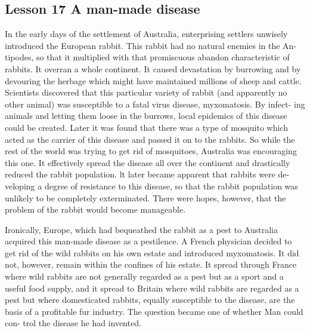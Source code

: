\documentclass[kindlepaper]{BHCexam4kindle}
\begin{document}
\subsection{Lesson 17
A man-made disease}
\par
In the early days of the settlement of Australia, enterprising settlers unwisely
introduced the European rabbit. This rabbit had no natural enemies in the An-
tipodes, so that it multiplied with that promiscuous abandon characteristic of
rabbits. It overran a whole continent. It caused devastation by burrowing and
by devouring the herbage which might have maintained millions of sheep and
cattle. Scientists discovered that this particular variety of rabbit (and apparently
no other animal) was susceptible to a fatal virus disease, myxomatosis. By infect-
ing animals and letting them loose in the burrows, local epidemics of this disease
could be created. Later it was found that there was a type of mosquito which
acted as the carrier of this disease and passed it on to the rabbits. So while the
rest of the world was trying to get rid of mosquitoes, Australia was encouraging
this one. It effectively spread the disease all over the continent and drastically
reduced the rabbit population. lt later became apparent that rabbits were de-
veloping a degree of resistance to this disease, so that the rabbit population was
unlikely to be completely exterminated. There were hopes, however, that the
problem of the rabbit would become manageable.
\par
Ironically, Europe, which had bequeathed the rabbit as a pest to Australia
acquired this man-made disease as a pestilence. A French physician decided to
get rid of the wild rabbits on his own estate and introduced myxomatosis. It did
not, however, remain within the confines of his estate. It spread through France
where wild rabbits are not generally regarded as a pest but as a sport and a useful
food supply, and it spread to Britain where wild rabbits are regarded as a pest
but where domesticated rabbits, equally susceptible to the disease, are the basis
of a profitable fur industry. The question became one of whether Man could con-
trol the disease he had invented.
\clearpage
\end{document}
